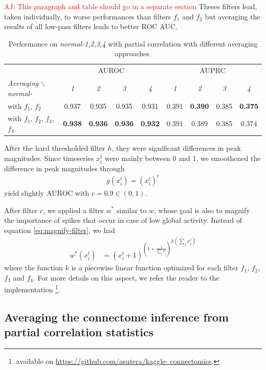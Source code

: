 \documentclass[wcp]{jmlr}
\begin{document}
\textcolor{red}{AJ: This paragraph and table should go in a separate section}
Theses filters lead, taken individually, to worse performances  than filters
$f_1$ and $f_2$ but averaging the results of all low-pass filters leads to better ROC AUC.
\begin{table}[ht]\label{tab:comparison}
\centering
\small
\begin{tabular}{| l | c c c c | c c c c |}
\hline
& \multicolumn{4}{c|}{AUROC} & \multicolumn{4}{c|}{AUPRC} \\
\textit{Averaging} $\backslash$ \textit{normal-} & \textit{1} & \textit{2} & \textit{3} & \textit{4} & \textit{1} & \textit{2} & \textit{3} & \textit{4} \\
\hline
\hline
 with $f_1$, $f_2$ & 0.937 & 0.935 & 0.935 & 0.931 & 0.391 &  \textbf{0.390} &  0.385 & \textbf{0.375}  \\
 with $f_1$, $f_2$, $f_3$, $f_4$ & \textbf{0.938} & \textbf{0.936} & \textbf{0.936} & \textbf{0.932} & 0.391 & 0.389 & 0.385 & 0.374\\
\hline
\end{tabular}
\caption{Performance on \textit{normal-1,2,3,4} with partial correlation with different averaging approaches.}
\end{table}

After the hard thresholded filter $h$, they were significant differences in
peak magnitudes. Since timeseries $x_i^t$  were mainly between 0 and 1,
we smoothened the difference in peak magnitudes through
\begin{align}
g(x^t_i) = (x_i^t)^c
\end{align}
yield slightly AUROC with $c=0.9 \in (0, 1)$.

After filter $c$, we applied a filter $w^*$ similar to $w$, whose goal is also
to magnify the importance of spikes that occur in case of low global activity.
Instead of equation \ref{eq:magnify-filter}, we had
\begin{align}
 w^*(x^{t}_i) &= {(x^{t}_i + 1 )^{\left (1 + \frac{1}{\sum_{j} x^{t}_j}\right )}}^{k(\sum_{j} x^{t}_j)}
\end{align}
where the function $k$ is a piecewise linear function optimized for each filter
$f_1$, $f_2$, $f_3$ and $f_4$. For more details on this aspect, we refer the
reader to the implementation \footnote{available on
\url{https://github.com/asutera/kaggle- connectomics}.}.

\subsection*{Averaging the connectome inference from partial correlation statistics}
\end{document}
